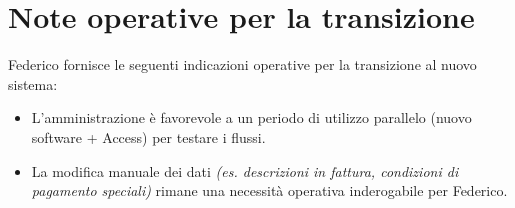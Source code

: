 \documentclass[12pt, a4paper]{article} %
\begin{document}
\section{Note operative per la transizione}
Federico fornisce le seguenti indicazioni operative per la transizione al nuovo
sistema:
\begin{itemize}
      \item L'amministrazione è favorevole a un periodo di utilizzo parallelo (nuovo
            software + Access) per testare i flussi.
      \item La modifica manuale dei dati \textit{(es. descrizioni in fattura, condizioni di
                  pagamento speciali)} rimane una necessità operativa inderogabile per Federico.
\end{itemize}
\end{document}
